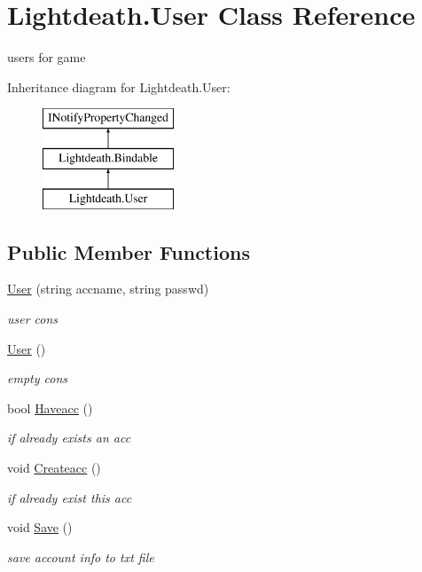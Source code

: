 \hypertarget{class_lightdeath_1_1_user}{}\section{Lightdeath.\+User Class Reference}
\label{class_lightdeath_1_1_user}


users for game  


Inheritance diagram for Lightdeath.\+User\+:\begin{figure}[H]
\begin{center}
\leavevmode
\includegraphics[height=3.000000cm]{class_lightdeath_1_1_user}
\end{center}
\end{figure}
\subsection*{Public Member Functions}
\begin{DoxyCompactItemize}
\item 
\hyperlink{class_lightdeath_1_1_user_abe8e82a95feb78b813517fb95c1531b1}{User} (string accname, string passwd)
\begin{DoxyCompactList}\small\item\em user cons \end{DoxyCompactList}\item 
\hyperlink{class_lightdeath_1_1_user_ab460f485baaef386d0d7e6c579d7bf75}{User} ()
\begin{DoxyCompactList}\small\item\em empty cons \end{DoxyCompactList}\item 
bool \hyperlink{class_lightdeath_1_1_user_a1352aa65bececdd6929a5756ef2201a5}{Haveacc} ()
\begin{DoxyCompactList}\small\item\em if already exists an acc \end{DoxyCompactList}\item 
void \hyperlink{class_lightdeath_1_1_user_ac77fa197be642fc86594156f1b4674ce}{Createacc} ()
\begin{DoxyCompactList}\small\item\em if already exist this acc \end{DoxyCompactList}\item 
void \hyperlink{class_lightdeath_1_1_user_a2bd89104f7fb1580a09f4a12defc1dea}{Save} ()
\begin{DoxyCompactList}\small\item\em save account info to txt file \end{DoxyCompactList}\end{DoxyCompactItemize}
